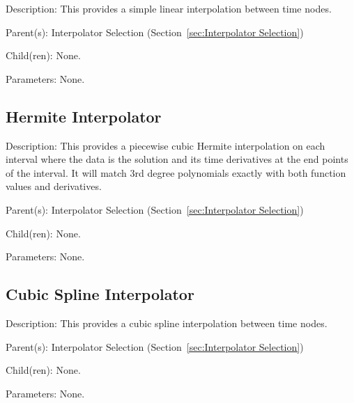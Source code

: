 \begin{list}{}
  {\setlength{\leftmargin}{1.0in}
   \setlength{\labelwidth}{0.75in}
   \setlength{\labelsep}{0.125in}}
  \item[Description:]
    This provides a simple linear interpolation between time nodes.
  \item[Parent(s):]
    Interpolator Selection (Section~\ref{sec:Interpolator Selection})
  \item[Child(ren):]
    None. 
  \item[Parameters:]
    None. 
\end{list}

\subsection{Hermite Interpolator}
\label{sec:Hermite Interpolator}

\begin{list}{}
  {\setlength{\leftmargin}{1.0in}
   \setlength{\labelwidth}{0.75in}
   \setlength{\labelsep}{0.125in}}
  \item[Description:]
    This provides a piecewise cubic Hermite interpolation on each interval where the data is the solution and its time derivatives at the end points of the interval.  It will match 3rd degree polynomials exactly with both function values and derivatives.
  \item[Parent(s):]
    Interpolator Selection (Section~\ref{sec:Interpolator Selection})
  \item[Child(ren):]
    None. 
  \item[Parameters:]
    None. 
\end{list}

\subsection{Cubic Spline Interpolator}
\label{sec:Cubic Spline Interpolator}

\begin{list}{}
  {\setlength{\leftmargin}{1.0in}
   \setlength{\labelwidth}{0.75in}
   \setlength{\labelsep}{0.125in}}
  \item[Description:]
    This provides a cubic spline interpolation between time nodes.
  \item[Parent(s):]
    Interpolator Selection (Section~\ref{sec:Interpolator Selection})
  \item[Child(ren):]
    None. 
  \item[Parameters:]
    None. 
\end{list}


